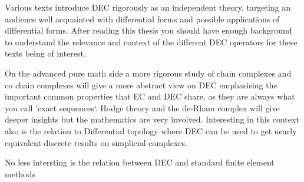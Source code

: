 Various texts introduce DEC rigorously as an independent theory, targeting an audience well acquainted with differential forms and possible applications of differential forms. After reading this thesis you should have enough background to understand the relevance and context of the different DEC operators for these texts being of interest. 



On the advanced pure math side a more rigorous study of chain complexes and co chain complexes will give a more abstract view on DEC emphasising the important common properties that EC and DEC share, as they are always what you call 'exact sequences`. 
Hodge theory and the de-Rham complex will give deeper insights but the mathematics are very involved. 
Interesting in this context also is the relation to Differential topology where DEC can be used  to get nearly equivalent discrete results on simplicial complexes.

No less intersting is the relation between DEC and standard finite element methods 